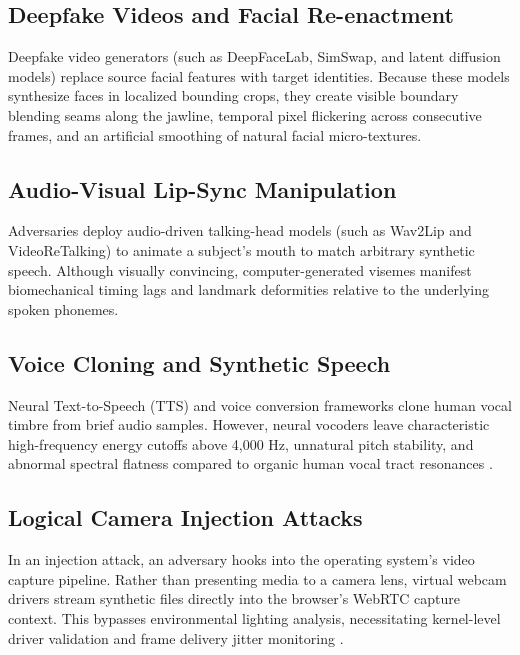 \documentclass[conference]{IEEEtran}
\begin{document}
\subsection{Deepfake Videos and Facial Re-enactment}
Deepfake video generators (such as DeepFaceLab, SimSwap, and latent diffusion models) replace source facial features with target identities. Because these models synthesize faces in localized bounding crops, they create visible boundary blending seams along the jawline, temporal pixel flickering across consecutive frames, and an artificial smoothing of natural facial micro-textures.

\subsection{Audio-Visual Lip-Sync Manipulation}
Adversaries deploy audio-driven talking-head models (such as Wav2Lip and VideoReTalking) to animate a subject's mouth to match arbitrary synthetic speech. Although visually convincing, computer-generated visemes manifest biomechanical timing lags and landmark deformities relative to the underlying spoken phonemes.

\subsection{Voice Cloning and Synthetic Speech}
Neural Text-to-Speech (TTS) and voice conversion frameworks clone human vocal timbre from brief audio samples. However, neural vocoders leave characteristic high-frequency energy cutoffs above 4,000 Hz, unnatural pitch stability, and abnormal spectral flatness compared to organic human vocal tract resonances \cite{borodin2024aasist3}.

\subsection{Logical Camera Injection Attacks}
In an injection attack, an adversary hooks into the operating system's video capture pipeline. Rather than presenting media to a camera lens, virtual webcam drivers stream synthetic files directly into the browser's WebRTC capture context. This bypasses environmental lighting analysis, necessitating kernel-level driver validation and frame delivery jitter monitoring \cite{iso30107}.
\end{document}
